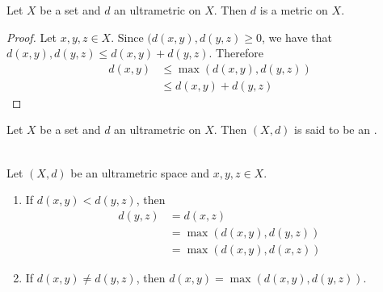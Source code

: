 \documentclass{book}
\begin{document}
\begin{ex}
	Let $X$ be a set and $d$ an ultrametric on $X$. Then $d$ is a metric on $X$.
\end{ex}

\begin{proof}
	Let $x,y,z \in X$. Since $(d(x,y) , d(y,z) \geq 0$, we have that $d(x,y), d(y,z) \leq  d(x,y) + d(y,z)$. Therefore
	\begin{align*}
		d(x,y)
		& \leq \max(d(x,y) , d(y,z)) \\
		& \leq  d(x,y) + d(y,z)
	\end{align*}
\end{proof}

\begin{defn}
	Let $X$ be a set and $d$ an ultrametric on $X$. Then $(X, d)$ is said to be an .
\end{defn}

\begin{ex}  \\
	Let $(X,d)$ be an ultrametric space and $x,y, z \in X$. 
	\begin{enumerate}
		\item If $d(x,y) < d(y,z)$, then 
		\begin{align*}
			d(y,z)
			& = d(x,z) \\
			& = \max(d(x,y), d(y,z)) \\
			& = \max(d(x,y), d(x,z))
		\end{align*}
		\item If $d(x,y) \neq d(y,z)$, then $d(x,y) = \max(d(x,y), d(y,z))$.
	\end{enumerate} 
\end{ex}
\end{document}
